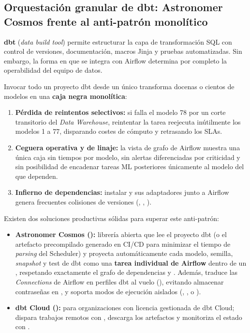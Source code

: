 \subsection{Orquestación granular de dbt: Astronomer Cosmos frente al anti-patrón monolítico}

\textbf{dbt} (\textit{data build tool}) permite estructurar la capa de transformación SQL con control de versiones, documentación, macros Jinja y pruebas automatizadas. Sin embargo, la forma en que se integra con Airflow determina por completo la operabilidad del equipo de datos.

\begin{warningbox}[Anti-patrón: \texttt{BashOperator(bash\_command="dbt run \&\& dbt test")}]
Invocar todo un proyecto dbt desde un único  transforma docenas o cientos de modelos en una \textbf{caja negra monolítica}:
\begin{enumerate}
  \item \textbf{Pérdida de reintentos selectivos:} si falla el modelo 78 por un corte transitorio del \textit{Data Warehouse}, reintentar la tarea reejecuta inútilmente los modelos 1 a 77, disparando costes de cómputo y retrasando los SLAs.
  \item \textbf{Ceguera operativa y de linaje:} la vista de grafo de Airflow muestra una única caja sin tiempos por modelo, sin alertas diferenciadas por criticidad y sin posibilidad de encadenar tareas ML posteriores únicamente al modelo del que dependen.
  \item \textbf{Infierno de dependencias:} instalar  y sus adaptadores junto a Airflow genera frecuentes colisiones de versiones (, , ).
\end{enumerate}
\end{warningbox}

Existen dos soluciones productivas sólidas para superar este anti-patrón:
\begin{itemize}
  \item \textbf{Astronomer Cosmos ():} librería abierta que lee el proyecto dbt (o el artefacto precompilado  generado en CI/CD para minimizar el tiempo de \textit{parsing} del Scheduler) y proyecta automáticamente cada modelo, semilla, \textit{snapshot} y test de dbt como una \textbf{tarea individual de Airflow} dentro de un , respetando exactamente el grafo de dependencias  y . Además, traduce las \textit{Connections} de Airflow en perfiles dbt al vuelo (), evitando almacenar contraseñas en , y soporta modos de ejecución aislados (, ,  o ).
  \item \textbf{dbt Cloud ():} para organizaciones con licencia gestionada de dbt Cloud; dispara trabajos remotos con , descarga los artefactos  y monitoriza el estado con .
\end{itemize}

